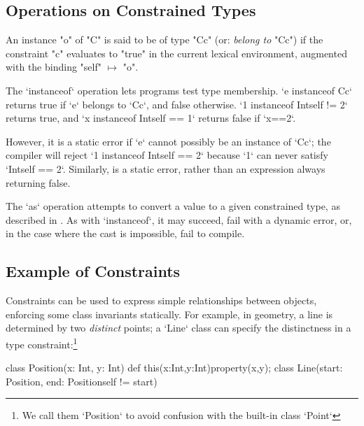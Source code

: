 {\subsection{Operations on Constrained Types}

An instance \xcd"o" of \xcd"C" is said to be of type \xcd"C{c}" (or: {\em
belong to} \xcd"C{c}") if the constraint \xcd"c" evaluates to \xcd"true" in
the current lexical environment, augmented with the binding \xcd"self"
$\mapsto$ \xcd"o".

The \xcd`instanceof` operation lets programs test type membership.  
\xcd`e instanceof C{c}` returns true if \xcd`e` belongs to \xcd`C{c}`, and
false otherwise.  
\xcd`1 instanceof Int{self != 2}` returns true, 
and 
\xcd`x instanceof Int{self == 1}` returns false if 
\xcd`x==2`.

However, it is a static error if \xcd`e` cannot possibly be an instance of
\xcd`C{c}`; the compiler will reject \xcd`1 instanceof Int{self == 2}` because
\xcd`1` can never satisfy \xcd`Int{self == 2}`. Similarly,  is a static error, rather than an expression always returning false. 



The \xcd`as` operation attempts to convert a value to a given constrained
type, as described in .   As with \xcd`instanceof`, it may
succeed, fail with a dynamic error, or, in the case where the cast is
impossible, fail to compile.


\subsection{Example of Constraints}

\begin{example}

Constraints can be used to express simple relationships between objects,
enforcing some class invariants statically.  For example, in geometry, a line
is determined by two {\em distinct} points; a \xcd`Line` class can specify the
distinctness in a type constraint:\footnote{We call them
\xcd`Position` to avoid confusion with the built-in class \xcd`Point`}

% 
\begin{xten}
class Position(x: Int, y: Int) {
   def this(x:Int,y:Int){property(x,y);}
   }
class Line(start: Position, 
           end: Position{self != start}) {}
\end{xten}


\end{example}}
